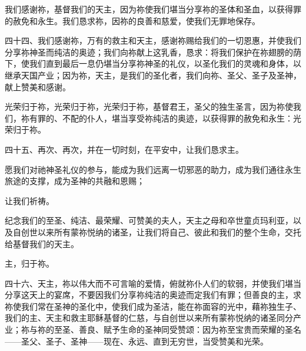 \par

我们感谢祢，基督我们的天主，因为祢使我们堪当分享祢的圣体和圣血，以获得罪的赦免和永生。我们恳求祢，因祢的良善和慈爱，使我们无罪地保存。\par

\par

四十四、我们感谢祢，万有的救主和天主，感谢祢赐给我们的一切恩惠，并使我们分享祢神圣而纯洁的奥迹；我们向祢献上这乳香，恳求：将我们保护在祢翅膀的荫下，使我们直到最后一息仍堪当分享祢神圣的礼仪，以圣化我们的灵魂和身体，以继承天国产业；因为祢，天主，是我们的圣化者，我们向祢、圣父、圣子及圣神，献上赞美和感谢。\par

\par

光荣归于祢，光荣归于祢，光荣归于祢，基督君王，圣父的独生圣言，因为祢使我们，祢有罪的、不配的仆人，堪当享受祢纯洁的奥迹，以获得罪的赦免和永生：光荣归于祢。\par

\par

四十五、再次、再次，并在一切时刻，在平安中，让我们恳求主。\par

愿我们对祂神圣礼仪的参与，能成为我们远离一切邪恶的助力，成为我们通往永生旅途的支撑，成为圣神的共融和恩赐；\par

让我们祈祷。\par

\par

纪念我们的至圣、纯洁、最荣耀、可赞美的夫人，天主之母和卒世童贞玛利亚，以及自创世以来所有蒙祢悦纳的诸圣，让我们将自己、彼此和我们的整个生命，交托给基督我们的天主。\par

\par

主，归于祢。\par

\par

四十六、天主，祢以伟大而不可言喻的爱情，俯就祢仆人们的软弱，并使我们堪当分享这天上的宴席，不要因我们分享祢纯洁的奥迹而定我们有罪；但善良的主，求祢使我们常在圣神的圣化中，使我们成为圣洁，能在祢面容的光中，藉祢独生子、我们的主、天主和救主耶稣基督的仁慈，与自创世以来所有蒙祢悦纳的诸圣同分产业；祢与祢的至圣、善良、赋予生命的圣神同受赞颂：因为祢至宝贵而荣耀的圣名——圣父、圣子、圣神——现在、永远、直到无穷世，当受赞美和光荣。\par

